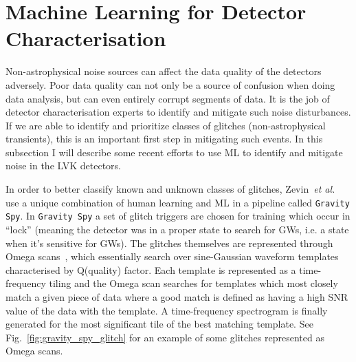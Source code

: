\section{Machine Learning for Detector Characterisation}

%
Non-astrophysical noise sources can affect the data quality of the 
detectors adversely. Poor data quality can not only be a 
source of confusion when doing data analysis, but can even entirely 
corrupt segments of data. It is the job of 
detector characterisation experts to identify and mitigate 
such noise disturbances. If we are able to identify and 
prioritize classes of glitches (non-astrophysical transients), this 
is an important first step in mitigating such events. In this 
subsection I will describe some recent efforts to use \ac{ML} to 
identify and mitigate noise in the \ac{LVK} detectors.

%
In order to better classify known and unknown classes of glitches, 
Zevin~\textit{et al.}~\cite{0264-9381-34-6-064003} use a 
unique combination of human learning and \ac{ML} in a pipeline called
\texttt{Gravity Spy}. In \texttt{Gravity Spy} a set of glitch 
triggers are chosen for training which occur in ``lock'' 
(meaning the detector was in a proper state to search for 
\ac{GW}s, i.e. a state when it's sensitive for \ac{GW}s). The 
glitches themselves are represented through Omega
scans~\cite{Chatterji_2004}, 
which essentially search over sine-Gaussian waveform templates 
characterised by Q(quality) factor. Each template is represented as a time-frequency tiling and the Omega scan searches for templates 
which most closely match a given piece of data where a good match 
is defined as having a high \ac{SNR} value of the data with the template. A
time-frequency spectrogram is finally generated for the most 
significant tile of the best matching template. See 
Fig.~\ref{fig:gravity_spy_glitch} for an example of some glitches  
represented as Omega scans. 

